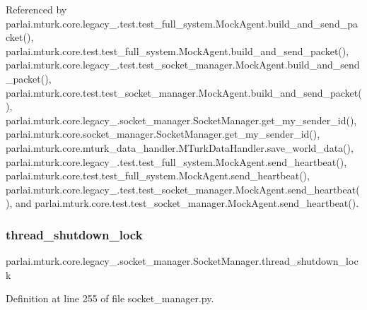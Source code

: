 Referenced by parlai.\+mturk.\+core.\+legacy\+\_.\+test.\+test\+\_\+full\+\_\+system.\+Mock\+Agent.\+build\+\_\+and\+\_\+send\+\_\+packet(), parlai.\+mturk.\+core.\+test.\+test\+\_\+full\+\_\+system.\+Mock\+Agent.\+build\+\_\+and\+\_\+send\+\_\+packet(), parlai.\+mturk.\+core.\+legacy\+\_.\+test.\+test\+\_\+socket\+\_\+manager.\+Mock\+Agent.\+build\+\_\+and\+\_\+send\+\_\+packet(), parlai.\+mturk.\+core.\+test.\+test\+\_\+socket\+\_\+manager.\+Mock\+Agent.\+build\+\_\+and\+\_\+send\+\_\+packet(), parlai.\+mturk.\+core.\+legacy\+\_.\+socket\+\_\+manager.\+Socket\+Manager.\+get\+\_\+my\+\_\+sender\+\_\+id(), parlai.\+mturk.\+core.\+socket\+\_\+manager.\+Socket\+Manager.\+get\+\_\+my\+\_\+sender\+\_\+id(), parlai.\+mturk.\+core.\+mturk\+\_\+data\+\_\+handler.\+M\+Turk\+Data\+Handler.\+save\+\_\+world\+\_\+data(), parlai.\+mturk.\+core.\+legacy\+\_.\+test.\+test\+\_\+full\+\_\+system.\+Mock\+Agent.\+send\+\_\+heartbeat(), parlai.\+mturk.\+core.\+test.\+test\+\_\+full\+\_\+system.\+Mock\+Agent.\+send\+\_\+heartbeat(), parlai.\+mturk.\+core.\+legacy\+\_.\+test.\+test\+\_\+socket\+\_\+manager.\+Mock\+Agent.\+send\+\_\+heartbeat(), and parlai.\+mturk.\+core.\+test.\+test\+\_\+socket\+\_\+manager.\+Mock\+Agent.\+send\+\_\+heartbeat().

\mbox{\label{classparlai_1_1mturk_1_1core_1_1legacy__2018_1_1socket__manager_1_1SocketManager_a5bbcb26e24bb4799c92d6e432dad76f1}} 
\subsubsection{\texorpdfstring{thread\+\_\+shutdown\+\_\+lock}{thread\_shutdown\_lock}}
{\footnotesize\ttfamily parlai.\+mturk.\+core.\+legacy\+\_.\+socket\+\_\+manager.\+Socket\+Manager.\+thread\+\_\+shutdown\+\_\+lock}



Definition at line 255 of file socket\+\_\+manager.\+py.



